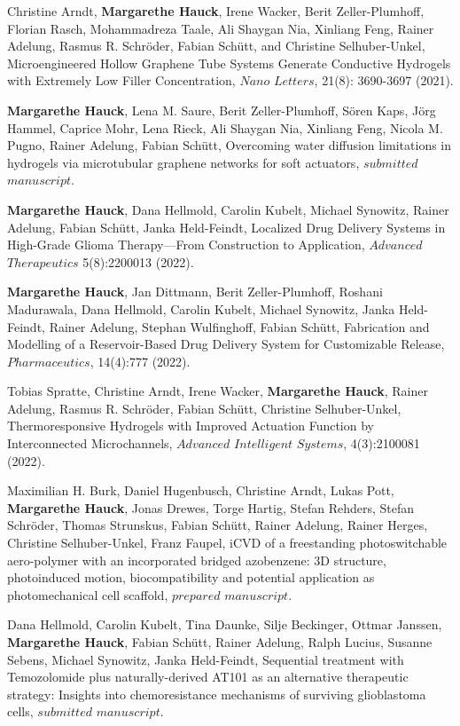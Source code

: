 \vspace{1 cm}
\begin{enumerate}[label={[\arabic*]}]
\item Christine Arndt, \textbf{Margarethe Hauck}, Irene Wacker, Berit Zeller-Plumhoff, Florian Rasch, Mohammadreza Taale, Ali Shaygan Nia, Xinliang Feng, Rainer Adelung, Rasmus R. Schröder, Fabian Schütt, and Christine Selhuber-Unkel, Microengineered Hollow Graphene Tube Systems Generate Conductive Hydrogels with Extremely Low Filler Concentration, $ Nano$ $Letters$,  21(8): 3690-3697 (2021). 
\item \textbf{Margarethe Hauck}, Lena M. Saure, Berit Zeller-Plumhoff, Sören Kaps, Jörg Hammel, Caprice Mohr, Lena Rieck, Ali Shaygan Nia, Xinliang Feng, Nicola M. Pugno, Rainer Adelung, Fabian Schütt, Overcoming water diffusion limitations in hydrogels via microtubular graphene networks for soft actuators, $submitted$ $manuscript$. 
\item \textbf{Margarethe Hauck}, Dana Hellmold, Carolin Kubelt, Michael Synowitz, Rainer Adelung, Fabian Schütt, Janka Held-Feindt, Localized Drug Delivery Systems in High-Grade Glioma Therapy—From Construction to Application, $Advanced$ $Therapeutics$ 5(8):2200013 (2022).
\item \textbf{Margarethe Hauck}, Jan Dittmann, Berit Zeller-Plumhoff, Roshani Madurawala, Dana Hellmold, Carolin Kubelt, Michael Synowitz, Janka Held-Feindt, Rainer Adelung, Stephan Wulfinghoff, Fabian Schütt, Fabrication and Modelling of a Reservoir-Based Drug Delivery System for Customizable Release, $Pharmaceutics$, 14(4):777 (2022). 
\item Tobias Spratte, Christine Arndt, Irene Wacker, \textbf{Margarethe Hauck}, Rainer Adelung, Rasmus R. Schröder, Fabian Schütt, Christine Selhuber-Unkel, Thermoresponsive Hydrogels with Improved Actuation Function by Interconnected Microchannels, $Advanced$ $Intelligent$ $Systems$, 4(3):2100081 (2022).
\item Maximilian H. Burk, Daniel Hugenbusch, Christine Arndt, Lukas Pott, \textbf{Margarethe Hauck}, Jonas Drewes, Torge Hartig, Stefan Rehders, Stefan Schröder, Thomas Strunskus, Fabian Schütt, Rainer Adelung, Rainer Herges, Christine Selhuber-Unkel, Franz Faupel, iCVD of a freestanding photoswitchable aero-polymer with an incorporated bridged azobenzene: 3D structure, photoinduced motion, biocompatibility and potential application as photomechanical cell scaffold, $prepared$ $manuscript$. 
\item Dana Hellmold, Carolin Kubelt, Tina Daunke, Silje Beckinger, Ottmar Janssen, \textbf{Margarethe Hauck}, Fabian Schütt, Rainer Adelung, Ralph Lucius, Susanne Sebens, Michael Synowitz, Janka Held-Feindt, Sequential treatment with Temozolomide plus naturally-derived AT101 as an alternative therapeutic strategy: Insights into chemoresistance mechanisms of surviving glioblastoma cells, $submitted$ $manuscript$.
\end{enumerate}
